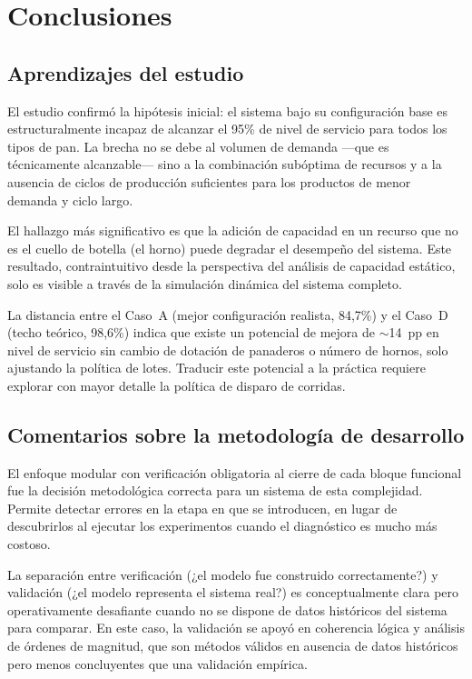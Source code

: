 \documentclass[12pt]{article}
\begin{document}
\newpage
\section{Conclusiones}
\label{sec:conclusiones}

\subsection{Aprendizajes del estudio}

El estudio confirmó la hipótesis inicial: el sistema bajo su configuración base es estructuralmente incapaz de alcanzar el 95\% de nivel de servicio para todos los tipos de pan. La brecha no se debe al volumen de demanda ---que es técnicamente alcanzable--- sino a la combinación subóptima de recursos y a la ausencia de ciclos de producción suficientes para los productos de menor demanda y ciclo largo.

El hallazgo más significativo es que la adición de capacidad en un recurso que no es el cuello de botella (el horno) puede degradar el desempeño del sistema. Este resultado, contraintuitivo desde la perspectiva del análisis de capacidad estático, solo es visible a través de la simulación dinámica del sistema completo.

La distancia entre el Caso~A (mejor configuración realista, 84,7\%) y el Caso~D (techo teórico, 98,6\%) indica que existe un potencial de mejora de $\sim$14~pp en nivel de servicio sin cambio de dotación de panaderos o número de hornos, solo ajustando la política de lotes. Traducir este potencial a la práctica requiere explorar con mayor detalle la política de disparo de corridas.

\subsection{Comentarios sobre la metodología de desarrollo}

El enfoque modular con verificación obligatoria al cierre de cada bloque funcional fue la decisión metodológica correcta para un sistema de esta complejidad. Permite detectar errores en la etapa en que se introducen, en lugar de descubrirlos al ejecutar los experimentos cuando el diagnóstico es mucho más costoso.

La separación entre verificación (¿el modelo fue construido correctamente?) y validación (¿el modelo representa el sistema real?) es conceptualmente clara pero operativamente desafiante cuando no se dispone de datos históricos del sistema para comparar. En este caso, la validación se apoyó en coherencia lógica y análisis de órdenes de magnitud, que son métodos válidos en ausencia de datos históricos pero menos concluyentes que una validación empírica.
\end{document}
